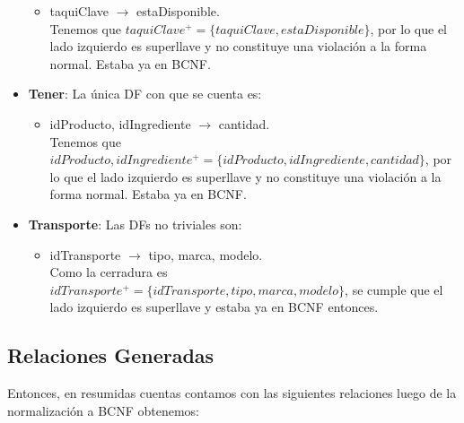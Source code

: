 \documentclass[11pt,letterpaper]{article}
\begin{document}
\begin{itemize}
\begin{itemize}
\item taquiClave $\rightarrow$ estaDisponible.\\ Tenemos que $taquiClave^+=\{taquiClave,estaDisponible\}$, por lo que el lado izquierdo es superllave y no constituye una violación a la forma normal. Estaba ya en BCNF. \checkmark
\end{itemize}
\item \textbf{Tener}: La única DF con que se cuenta es:

\begin{itemize}
\item idProducto, idIngrediente $\rightarrow$  cantidad.\\ Tenemos que $idProducto, idIngrediente^+=\{idProducto, idIngrediente,cantidad\}$, por lo que el lado izquierdo es superllave y no constituye una violación a la forma normal. Estaba ya en BCNF. \checkmark
\end{itemize}
\item \textbf{Transporte}: Las DFs no triviales son:

\begin{itemize}
\item idTransporte $\rightarrow$  tipo, marca, modelo.\\Como la cerradura es $idTransporte^+ =\{idTransporte,tipo, marca, modelo\}$, se cumple que el lado izquierdo es superllave y estaba ya en BCNF entonces. \checkmark
\end{itemize}
\end{itemize}

\subsection{Relaciones Generadas}
Entonces, en resumidas cuentas contamos con las siguientes relaciones luego de la normalización a BCNF obtenemos:
\end{document}
